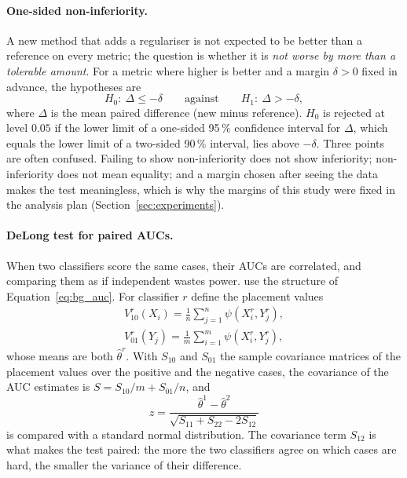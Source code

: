 \paragraph{One-sided non-inferiority.} A new method that adds a regulariser is not expected to be better than a reference on every metric; the
question is whether it is \emph{not worse by more than a tolerable amount}. For a metric where higher is better and a margin $\delta>0$ fixed in
advance, the hypotheses are
\begin{equation}
H_0:\ \Delta\le-\delta\qquad\text{against}\qquad H_1:\ \Delta>-\delta ,
\label{eq:bg_noninf}
\end{equation}
where $\Delta$ is the mean paired difference (new minus reference). $H_0$ is rejected at level $0.05$ if the lower limit of a one-sided 95\,\%
confidence interval for $\Delta$, which equals the lower limit of a two-sided 90\,\% interval, lies above $-\delta$. Three points are often
confused. Failing to show non-inferiority does not show inferiority; non-inferiority does not mean equality; and a margin chosen after seeing the
data makes the test meaningless, which is why the margins of this study were fixed in the analysis plan (Section~\ref{sec:experiments}).

\paragraph{DeLong test for paired AUCs.} When two classifiers score the same cases, their AUCs are correlated, and comparing them as if
independent wastes power. \citet{delong1988auc} use the structure of Equation~\eqref{eq:bg_auc}. For classifier $r$ define the placement values
\begin{equation}
\begin{gathered}
V^{r}_{10}(X_i)=\frac1n\sum_{j=1}^{n}\psi(X^{r}_i,Y^{r}_j),\\
V^{r}_{01}(Y_j)=\frac1m\sum_{i=1}^{m}\psi(X^{r}_i,Y^{r}_j),
\end{gathered}
\label{eq:bg_placements}
\end{equation}
whose means are both $\hat\theta^{r}$. With $S_{10}$ and $S_{01}$ the sample covariance matrices of the placement values over the positive and
the negative cases, the covariance of the AUC estimates is $S=S_{10}/m+S_{01}/n$, and
\begin{equation}
z=\frac{\hat\theta^{1}-\hat\theta^{2}}{\sqrt{S_{11}+S_{22}-2S_{12}}}
\label{eq:bg_delong}
\end{equation}
is compared with a standard normal distribution. The covariance term $S_{12}$ is what makes the test paired: the more the two classifiers agree
on which cases are hard, the smaller the variance of their difference.

